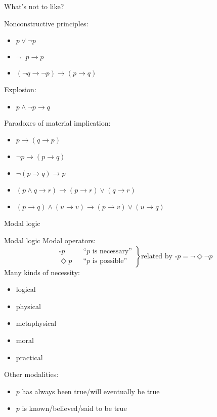 \documentclass{beamer}
\newcommand{\nec}{\square}
\newcommand{\poss}{\Diamond}
\newcommand{\sect}[1]{\begin{frame}\centerline{\large #1}\end{frame}}
\begin{document}
\begin{frame}{What's not to like?}

Nonconstructive principles:
\begin{itemize}
\item $p\lor\lnot p$
\item $\lnot\lnot p\to p$
\item $(\lnot q\to\lnot p)\to (p\to q)$
\end{itemize}

Explosion:
\begin{itemize}
\item $p\land\lnot p\to q$
\end{itemize}

Paradoxes of material implication:
\begin{itemize}
\item $p\to (q\to p)$
\item $\lnot p\to (p\to q)$
\item $\lnot(p\to q)\to p$
\item $(p\land q\to r) \to (p\to r)\lor (q\to r)$
\item $(p\to q)\land (u\to v)\to (p\to v)\lor (u\to q)$
\end{itemize}
\vfill
\end{frame}

\sect{Modal logic}

\begin{frame}{Modal logic}
Modal operators:
\[ \left.\begin{aligned}
    &\nec p && \text{``$p$ is necessary''} \\
    &\poss p && \text{``$p$ is possible''}
\end{aligned}\right\}
    \text{related by $\nec p = \lnot\poss\lnot p$} \]
Many kinds of necessity:
\begin{itemize}
\item logical
\item physical
\item metaphysical
\item moral
\item practical
\end{itemize}
Other modalities:
\begin{itemize}
\item $p$ has always been true/will eventually be true
\item $p$ is known/believed/said to be true
\end{itemize}
\end{frame}
\end{document}
